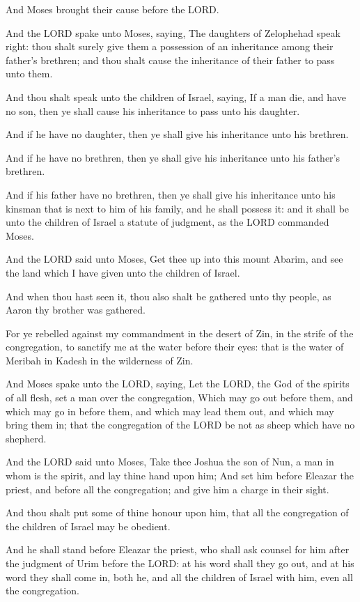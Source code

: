 \Verse And Moses brought their cause before the LORD.

\Verse And the LORD spake unto Moses, saying, \Verse The daughters of
Zelophehad speak right: thou shalt surely give them a possession of an
inheritance among their father's brethren; and thou shalt cause the
inheritance of their father to pass unto them.

\Verse And thou shalt speak unto the children of Israel, saying, If a
man die, and have no son, then ye shall cause his inheritance to pass
unto his daughter.

\Verse And if he have no daughter, then ye shall give his inheritance
unto his brethren.

\Verse And if he have no brethren, then ye shall give his inheritance
unto his father's brethren.

\Verse And if his father have no brethren, then ye shall give his
inheritance unto his kinsman that is next to him of his family, and he
shall possess it: and it shall be unto the children of Israel a
statute of judgment, as the LORD commanded Moses.

\Verse And the LORD said unto Moses, Get thee up into this mount
Abarim, and see the land which I have given unto the children of
Israel.

\Verse And when thou hast seen it, thou also shalt be gathered unto thy
people, as Aaron thy brother was gathered.

\Verse For ye rebelled against my commandment in the desert of Zin, in
the strife of the congregation, to sanctify me at the water before
their eyes: that is the water of Meribah in Kadesh in the wilderness
of Zin.

\Verse And Moses spake unto the LORD, saying, \Verse Let the LORD, the
God of the spirits of all flesh, set a man over the congregation,
\Verse Which may go out before them, and which may go in before them,
and which may lead them out, and which may bring them in; that the
congregation of the LORD be not as sheep which have no shepherd.

\Verse And the LORD said unto Moses, Take thee Joshua the son of Nun, a
man in whom is the spirit, and lay thine hand upon him; \Verse And set
him before Eleazar the priest, and before all the congregation; and
give him a charge in their sight.

\Verse And thou shalt put some of thine honour upon him, that all the
congregation of the children of Israel may be obedient.

\Verse And he shall stand before Eleazar the priest, who shall ask
counsel for him after the judgment of Urim before the LORD: at his
word shall they go out, and at his word they shall come in, both he,
and all the children of Israel with him, even all the congregation.


